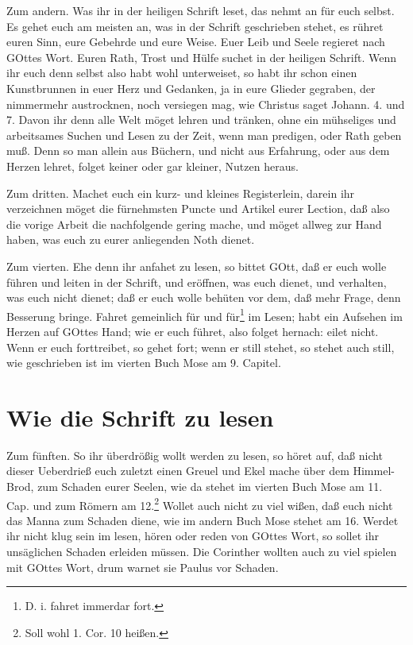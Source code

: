 Zum andern. Was ihr in der heiligen Schrift leset, das nehmt an für euch selbst. Es gehet euch am meisten an, was in der Schrift geschrieben stehet, es rühret euren Sinn, eure Gebehrde und eure Weise. Euer Leib und Seele regieret nach GOttes Wort. Euren Rath, Trost und Hülfe suchet in der heiligen Schrift. Wenn ihr euch denn selbst also habt wohl unterweiset, so habt ihr schon einen Kunstbrunnen in euer Herz und Gedanken, ja in eure Glieder gegraben, der nimmermehr austrocknen, noch versiegen mag, wie Christus saget Johann. 4. und 7. Davon ihr denn alle Welt möget lehren und tränken, ohne ein mühseliges und arbeitsames Suchen und Lesen zu der Zeit, wenn man predigen, oder Rath geben muß. Denn so man allein aus Büchern, und nicht aus Erfahrung, oder aus dem Herzen lehret, folget keiner oder gar kleiner, Nutzen heraus.

Zum dritten. Machet euch ein kurz- und kleines Registerlein, darein ihr verzeichnen möget die fürnehmsten Puncte und Artikel eurer Lection, daß also die vorige Arbeit die nachfolgende gering mache, und möget allweg zur Hand haben, was euch zu eurer anliegenden Noth dienet.

Zum vierten. Ehe denn ihr anfahet zu lesen, so bittet GOtt, daß er euch wolle führen und leiten in der Schrift, und eröffnen, was euch dienet, und verhalten, was euch nicht dienet; daß er euch wolle behüten vor dem, daß mehr Frage, denn Besserung bringe. Fahret gemeinlich für und für\footnote{D. i. fahret immerdar fort.} im Lesen; habt ein Aufsehen
im Herzen auf GOttes Hand; wie er euch führet, also folget hernach: eilet nicht. Wenn er euch forttreibet, so gehet fort; wenn er still stehet, so stehet auch still, wie geschrieben ist im vierten Buch Mose am 9. Capitel.

\section{Wie die Schrift zu lesen}

Zum fünften. So ihr überdrößig wollt werden zu lesen, so höret auf, daß nicht dieser Ueberdrieß euch zuletzt einen Greuel und Ekel mache über dem Himmel-Brod, zum Schaden eurer Seelen, wie da stehet im vierten Buch Mose am 11. Cap. und zum Römern am 12.\footnote{Soll wohl 1. Cor. 10 heißen.} Wollet auch nicht zu viel wißen, daß euch nicht das Manna zum Schaden diene, wie im andern Buch Mose stehet am 16. Werdet ihr nicht klug sein im lesen, hören oder reden von GOttes Wort, so sollet ihr unsäglichen Schaden erleiden müssen. Die Corinther wollten auch zu viel spielen mit GOttes Wort, drum warnet sie Paulus vor Schaden.

